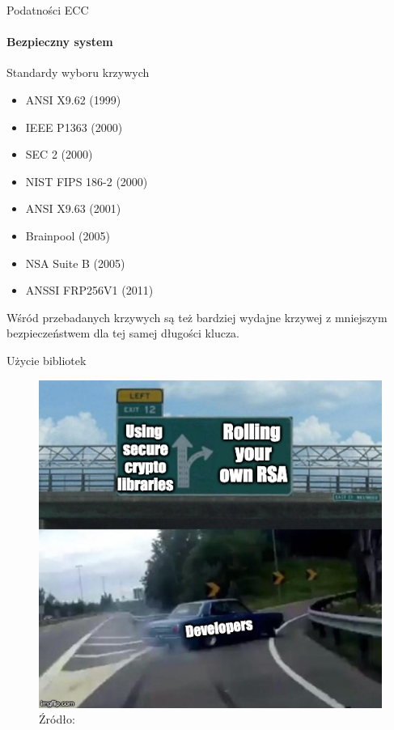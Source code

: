 \begin{frame}{Podatności ECC}
    \framesubtitle{Bezpieczny system}
    Standardy wyboru krzywych \cite{SafeCurves}
    \begin{scriptsize}
        \begin{itemize}
            \item ANSI X9.62 (1999)
            \item IEEE P1363 (2000)
            \item SEC 2 (2000)
            \item NIST FIPS 186-2 (2000)
            \item ANSI X9.63 (2001)
            \item Brainpool (2005)
            \item NSA Suite B (2005)
            \item ANSSI FRP256V1 (2011)
        \end{itemize}
    \end{scriptsize}
    \vspace{3mm}
    Wśród przebadanych krzywych są też bardziej wydajne krzywej z mniejszym bezpieczeństwem dla tej samej długości klucza. \cite{PracticalCryptographyForDevelopers}
\end{frame}


\begin{frame}{Użycie bibliotek}
\begin{figure}
    \centering
        \includegraphics[height=0.55\textwidth]{security/graphics/developer-implements-rsa-car-meme}
        \caption{Źródło: \cite{SeriouslyStopUsingRsa}}
\end{figure}
\end{frame}
